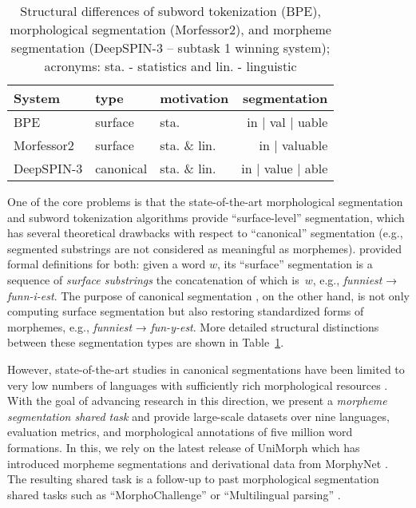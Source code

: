 \documentclass[11pt]{article}
\begin{document}
\begin{table}[t]
\small
{}
\centering
\begin{tabularx}{\linewidth}{l|ll|r}

System & type   & motivation   & segmentation             \\
\hline
\hline
BPE  & surface & sta. & in | val | uable       \\
Morfessor2  & surface    & sta. \& lin. & in | valuable         \\
DeepSPIN-3  & canonical & sta. \& lin. & in | value | able      \\

\hline
\end{tabularx}
\caption{\label{tab:examples} Structural differences of subword tokenization (BPE), morphological segmentation (Morfessor2), and morpheme segmentation (DeepSPIN-3 -- subtask 1 winning system); acronyms: sta. - statistics and lin. - linguistic}
\end{table}

One of the core problems is that the state-of-the-art morphological segmentation and subword tokenization algorithms provide  ``surface-level'' segmentation, which has several theoretical drawbacks  with respect to ``canonical'' segmentation (e.g., segmented substrings are not considered as meaningful as morphemes). \citet{cotterell2016joint} provided formal definitions for both:
given a word $w$, its ``surface'' segmentation is a sequence of \textit{surface substrings} the concatenation of which is~$w$, e.g., \textit{funniest} → \textit{funn-i-est}. The purpose of canonical segmentation \cite{kann-etal-2016-neural,Task2-TueSeg}, on the other hand, is not only computing surface segmentation but also restoring standardized forms of morphemes, e.g., \textit{funniest} → \textit{fun-y-est}. More detailed structural distinctions between these segmentation types are shown in Table~\ref{tab:examples}. 

However, state-of-the-art studies in canonical segmentations have been limited to very low numbers of languages with sufficiently rich morphological resources \cite{kurimo2010morpho,kurimo2010proceedings,cotterell2016joint,kann-etal-2018-fortification}. With the goal of advancing research in this direction, we present a \textit{morpheme segmentation shared task} and provide large-scale datasets over nine languages, evaluation metrics, and morphological annotations of five million word formations. In this, we rely on the latest release of UniMorph \cite{batsuren2022unimorph} which has introduced morpheme segmentations and derivational data from MorphyNet \cite{batsuren-etal-2021-morphynet}. The resulting shared task is a follow-up to past morphological segmentation shared tasks such as ``MorphoChallenge'' \cite{kurimo2007unsupervised,kurimo2008overview,kurimo2009overview} or ``Multilingual parsing''  \cite[where lemmatization as segmentation is a subtask]{zeman2017conll}.
\end{document}
